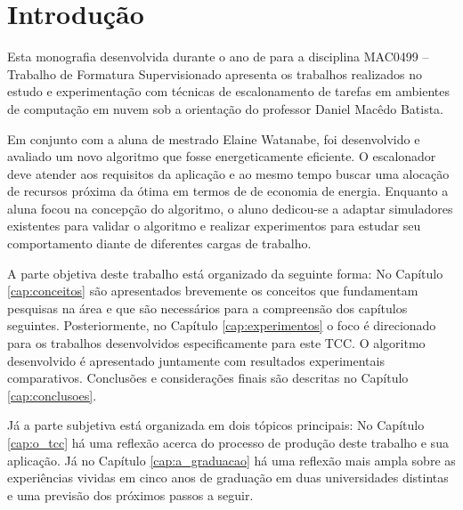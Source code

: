 \chapter{Introdução}
\label{cap:introducao}
Esta monografia desenvolvida durante o ano de  para a disciplina MAC0499 --
Trabalho de Formatura Supervisionado apresenta os trabalhos realizados no estudo
e experimentação com técnicas de escalonamento de tarefas em ambientes de 
computação em nuvem sob a orientação do professor Daniel Macêdo Batista.

Em conjunto com a aluna de mestrado Elaine Watanabe, foi desenvolvido e avaliado
um novo algoritmo que fosse energeticamente eficiente. O escalonador deve
atender aos requisitos da aplicação e ao mesmo tempo buscar uma alocação
de recursos próxima da ótima em termos de de economia de energia.
Enquanto a aluna focou na concepção do algoritmo, o aluno dedicou-se a adaptar
simuladores existentes para validar o algoritmo e realizar experimentos para 
estudar seu comportamento diante de diferentes cargas de trabalho.

A parte objetiva deste trabalho está organizado da seguinte forma: No Capítulo
\ref{cap:conceitos} são apresentados brevemente os conceitos que fundamentam
pesquisas na área e que são necessários para a compreensão dos capítulos
seguintes. Posteriormente, no Capítulo \ref{cap:experimentos} o foco é
direcionado para os trabalhos desenvolvidos especificamente para este TCC. 
O algoritmo desenvolvido é apresentado juntamente com resultados experimentais
comparativos. Conclusões e considerações finais são descritas no Capítulo
\ref{cap:conclusoes}.

Já a parte subjetiva está organizada em dois tópicos principais: No Capítulo 
\ref{cap:o_tcc} há uma reflexão acerca do processo de produção deste trabalho
e sua aplicação. Já no Capítulo \ref{cap:a_graduacao} há uma reflexão mais ampla
sobre as experiências vividas em cinco anos de graduação em duas universidades
distintas e uma previsão dos próximos passos a seguir.


